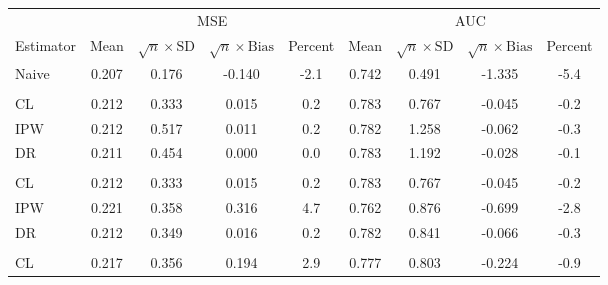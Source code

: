 \begin{table}[t]
\begin{threeparttable}
    \begin{tabular}{lcccccccc}
    \toprule
    \multicolumn{1}{c}{ } & \multicolumn{4}{c}{MSE} & \multicolumn{4}{c}{AUC} \\
    \cmidrule(l{3pt}r{3pt}){2-5} \cmidrule(l{3pt}r{3pt}){6-9}
    Estimator & Mean & $\sqrt{n}\times\text{SD}$ & $\sqrt{n}\times\text{Bias}$ & Percent & Mean & $\sqrt{n}\times\text{SD}$ & $\sqrt{n}\times\text{Bias}$ & Percent\\
    \midrule
    Naive & 0.207 & 0.176 & -0.140 & -2.1 & 0.742 & 0.491 & -1.335 & -5.4\\
    \addlinespace[0.3em]
    \multicolumn{9}{l}{Correct}\\
    \hspace{1em}CL & 0.212 & 0.333 & 0.015 & 0.2 & 0.783 & 0.767 & -0.045 & \vphantom{1} -0.2\\
    \hspace{1em}IPW & 0.212 & 0.517 & 0.011 & 0.2 & 0.782 & 1.258 & -0.062 & \vphantom{1} -0.3\\
    \hspace{1em}DR & 0.211 & 0.454 & 0.000 & 0.0 & 0.783 & 1.192 & -0.028 & -0.1\\
    \addlinespace[0.3em]
    \multicolumn{9}{l}{$e_a(X)$ misspecified}\\
    \hspace{1em}CL & 0.212 & 0.333 & 0.015 & 0.2 & 0.783 & 0.767 & -0.045 & -0.2\\
    \hspace{1em}IPW & 0.221 & 0.358 & 0.316 & 4.7 & 0.762 & 0.876 & -0.699 & -2.8\\
    \hspace{1em}DR & 0.212 & 0.349 & 0.016 & 0.2 & 0.782 & 0.841 & -0.066 & -0.3\\
    \addlinespace[0.3em]
    \multicolumn{9}{l}{$h_a(X)$ misspecified}\\
    \hspace{1em}CL & 0.217 & 0.356 & 0.194 & 2.9 & 0.777 & 0.803 & -0.224 & -0.9\\

\end{tabular}
\end{threeparttable}
\end{table}
